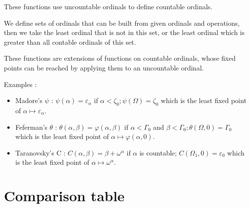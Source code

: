 \documentclass[10pt]{article}
\begin{document}
These functions use uncountable ordinals to define countable ordinals.

We define sets of ordinals that can be built from given ordinals and operations, then we take the least ordinal that is not in this set, or the least ordinal which is greater than all contable ordinals of this set.

These functions are extensions of functions on countable ordinals, whose fixed points can be reached by applying them to an uncountable ordinal.

Examples :

\smallskip
\begin{itemize}
     \setlength{\itemsep}{1pt}
     \setlength{\parskip}{0pt}
     \setlength{\parsep}{0pt}
\item Madore's \(\psi\) : \(\psi(\alpha) = \varepsilon_\alpha \) if \(\alpha < \zeta_0 ; \psi(\Omega) = \zeta_0 \) which is the least fixed point of \( \alpha \mapsto \varepsilon_\alpha \).

\item Feferman's \(\theta\) : \(\theta(\alpha,\beta) = \varphi(\alpha,\beta) \) if \( \alpha < \Gamma_0 \) and \( \beta < \Gamma_0 ; \theta(\Omega,0) = \Gamma_0 \) which is the least fixed point of \( \alpha \mapsto \varphi(\alpha,0) \).

\item Taranovsky's C : \( C(\alpha,\beta) = \beta+\omega^\alpha \) if \( \alpha \) is countable; \( C(\Omega_1,0) = \varepsilon_0 \) which is the least fixed point of \( \alpha \mapsto \omega^\alpha \).
\end{itemize}

\section{Comparison table}
\end{document}
